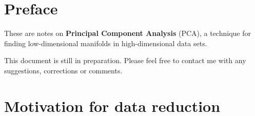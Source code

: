 \documentclass[10pt,twocolumn]{article}
\begin{document}



\vspace{10mm}

\setlength{\parindent}{0cm}

\section*{Preface}

These are notes on \textbf{Principal Component Analysis} (PCA), a technique for finding low-dimensional manifolds in high-dimensional data sets.

This document is still in preparation. Please feel free to contact me with any suggestions, corrections or comments.

\tableofcontents

\section{Motivation for data reduction}
\end{document}
